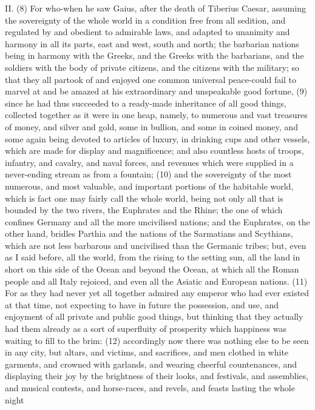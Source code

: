 II. (8) For who-when he saw Gaius, after the death of Tiberius Caesar, assuming the sovereignty
of the whole world in a condition free from all sedition, and regulated by and obedient to admirable
laws, and adapted to unanimity and harmony in all its parts, east and west, south and north; the
barbarian nations being in harmony with the Greeks, and the Greeks with the barbarians, and the
soldiers with the body of private citizens, and the citizens with the military; so that they all partook of
and enjoyed one common universal peace-could fail to marvel at and be amazed at his
extraordinary and unspeakable good fortune, (9) since he had thus succeeded to a ready-made
inheritance of all good things, collected together as it were in one heap, namely, to numerous and
vast treasures of money, and silver and gold, some in bullion, and some in coined money, and
some again being devoted to articles of luxury, in drinking cups and other vessels, which are made
for display and magnificence; and also countless hosts of troops, infantry, and cavalry, and naval
forces, and revenues which were supplied in a never-ending stream as from a fountain; (10) and
the sovereignty of the most numerous, and most valuable, and important portions of the habitable
world, which is fact one may fairly call the whole world, being not only all that is bounded by the two
rivers, the Euphrates and the Rhine; the one of which confines Germany and all the more
uncivilised nations; and the Euphrates, on the other hand, bridles Parthia and the nations of the
Sarmatians and Scythians, which are not less barbarous and uncivilised than the Germanic tribes;
but, even as I said before, all the world, from the rising to the setting sun, all the land in short on this
side of the Ocean and beyond the Ocean, at which all the Roman people and all Italy rejoiced, and
even all the Asiatic and European nations. (11) For as they had never yet all together admired any
emperor who had ever existed at that time, not expecting to have in future the possession, and
use, and enjoyment of all private and public good things, but thinking that they actually had them
already as a sort of superfluity of prosperity which happiness was waiting to fill to the brim: (12)
accordingly now there was nothing else to be seen in any city, but altars, and victims, and
sacrifices, and men clothed in white garments, and crowned with garlands, and wearing cheerful
countenances, and displaying their joy by the brightness of their looks, and festivals, and
assemblies, and musical contests, and horse-races, and revels, and feasts lasting the whole night
